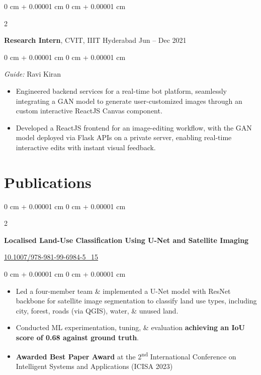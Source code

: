 \documentclass[10pt, a4paper]{article}
\newenvironment{highlights}{
    \begin{itemize}[
        topsep=0 cm,
        parsep=0 cm,
        partopsep=0pt,
        itemsep=0pt,
        leftmargin=0 cm + 10pt
    ]
}{
    \end{itemize}
} %
\newenvironment{onecolentry}{
    \begin{adjustwidth}{
        0 cm + 0.00001 cm
    }{
        0 cm + 0.00001 cm
    }
}{
    \end{adjustwidth}
} %
\newenvironment{twocolentry}[2][]{
    \onecolentry
    \def\secondColumn{#2}
    \setcolumnwidth{\fill, 6.0 cm}
    \begin{paracol}{2}
}{
    \switchcolumn \raggedleft \secondColumn
    \end{paracol}
    \endonecolentry
} %
\begin{document}
        \begin{twocolentry}{
            Jun – Dec 2021
        }
            \textbf{Research Intern}, CVIT, IIIT Hyderabad\end{twocolentry}

        \vspace{0.10 cm}
        \begin{onecolentry}
            \textit{Guide:} Ravi Kiran\\
            \begin{highlights}
                \item Engineered backend services for a real-time bot platform, seamlessly integrating a GAN model to generate user-customized images through an custom interactive ReactJS Canvas component.
                \item Developed a ReactJS frontend for an image-editing workflow, with the GAN model deployed via Flask APIs on a private server, enabling real-time interactive edits with instant visual feedback.
            \end{highlights}
        \end{onecolentry}
    
    \section{Publications}
        \begin{samepage}
            \begin{twocolentry}{
                \href{https://doi.org/10.1007/978-981-99-6984-5_15}{\underline{10.1007/978-981-99-6984-5\_15}}\\
            }
                \textbf{Localised Land-Use Classification Using U-Net and Satellite Imaging}
            \end{twocolentry}

            \vspace{0.10 cm}
            
            \begin{onecolentry}
                \begin{highlights}
                    \item Led a four-member team \& implemented a U-Net model with ResNet backbone for satellite image segmentation to classify land use types, including city, forest, roads (via QGIS), water, \& unused land.
                    \item Conducted ML experimentation, tuning, \& evaluation \textbf{achieving an IoU score of 0.68 against ground truth}.
                    \item \textbf{Awarded Best Paper Award} at the 2\textsuperscript{nd} International Conference on Intelligent Systems and Applications (ICISA 2023)
                \end{highlights}
        \end{onecolentry}
        \end{samepage}
\end{document}
